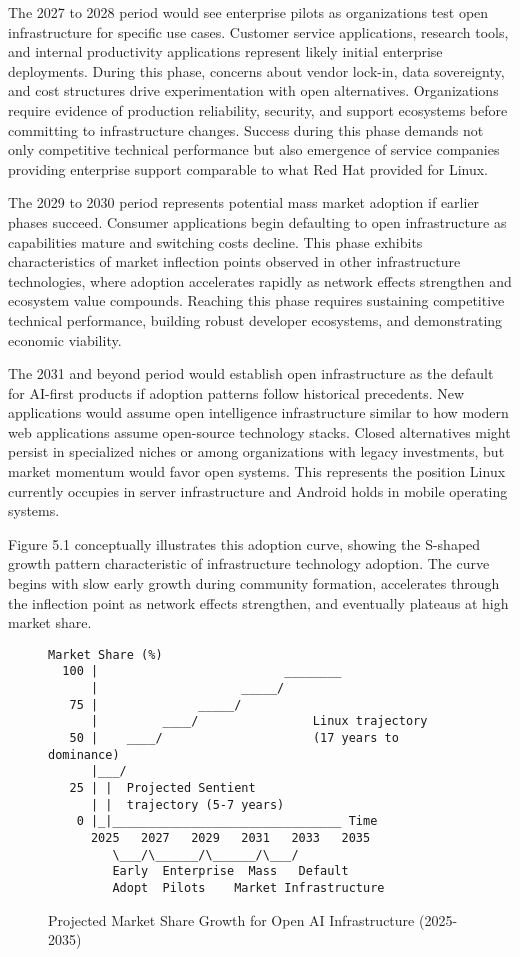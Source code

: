 The 2027 to 2028 period would see enterprise pilots as organizations test open infrastructure for specific use cases. Customer service applications, research tools, and internal productivity applications represent likely initial enterprise deployments. During this phase, concerns about vendor lock-in, data sovereignty, and cost structures drive experimentation with open alternatives. Organizations require evidence of production reliability, security, and support ecosystems before committing to infrastructure changes. Success during this phase demands not only competitive technical performance but also emergence of service companies providing enterprise support comparable to what Red Hat provided for Linux.

The 2029 to 2030 period represents potential mass market adoption if earlier phases succeed. Consumer applications begin defaulting to open infrastructure as capabilities mature and switching costs decline. This phase exhibits characteristics of market inflection points observed in other infrastructure technologies, where adoption accelerates rapidly as network effects strengthen and ecosystem value compounds. Reaching this phase requires sustaining competitive technical performance, building robust developer ecosystems, and demonstrating economic viability.

The 2031 and beyond period would establish open infrastructure as the default for AI-first products if adoption patterns follow historical precedents. New applications would assume open intelligence infrastructure similar to how modern web applications assume open-source technology stacks. Closed alternatives might persist in specialized niches or among organizations with legacy investments, but market momentum would favor open systems. This represents the position Linux currently occupies in server infrastructure and Android holds in mobile operating systems.

Figure 5.1 conceptually illustrates this adoption curve, showing the S-shaped growth pattern characteristic of infrastructure technology adoption. The curve begins with slow early growth during community formation, accelerates through the inflection point as network effects strengthen, and eventually plateaus at high market share.

\begin{figure}[h]
\centering
\begin{verbatim}
Market Share (%)
  100 |                          ________
      |                    _____/
   75 |              _____/
      |         ____/                Linux trajectory
   50 |    ____/                     (17 years to dominance)
      |___/
   25 | |  Projected Sentient
      | |  trajectory (5-7 years)
    0 |_|________________________________ Time
      2025   2027   2029   2031   2033   2035
         \___/\______/\______/\___/
         Early  Enterprise  Mass   Default
         Adopt  Pilots    Market Infrastructure
\end{verbatim}
\caption{Projected Market Share Growth for Open AI Infrastructure (2025-2035)}
\label{fig:adoption_curve}
\end{figure}

